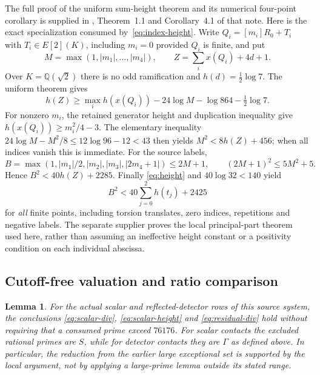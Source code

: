 \documentclass[11pt,a4paper]{article}
\newtheorem{lemma}[theorem]{Lemma}
\newcommand{\Q}{\mathbb Q}\newcommand{\Z}{\mathbb Z}
\begin{document}
The full proof of the uniform sum-height theorem and its numerical
four-point corollary is supplied in
,
Theorem~1.1 and Corollary~4.1 of that note. Here is the exact
specialization consumed by~\eqref{eq:index-height}.
Write $Q_i=[m_i]R_0+T_i$ with $T_i\in E[2](K)$,
including $m_i=0$ provided $Q_i$ is finite, and put
\[
 M=\max(1,|m_1|,\ldots,|m_4|),\qquad
 Z=\sum_i x(Q_i)+4d+1 .
\]
Over $K=\Q(\sqrt2)$ there is no odd ramification and
$h(d)=\tfrac12\log7$. The uniform theorem gives
\[
 h(Z)\ge\max_i h(x(Q_i))
              -24\log M-\log864-\tfrac12\log7 .
\]
For nonzero $m_i$, the retained generator height and duplication
inequality give $h(x(Q_i))\ge m_i^2/4-3$.
The elementary inequality
$24\log M-M^2/8\le12\log96-12<43$ then yields
$M^2<8h(Z)+456$; when all indices vanish this is immediate.
For the source labels,
\[
 B=\max(1,|m_1|/2,|m_2|,|m_3|,|2m_4+1|)
 \le2M+1,\qquad (2M+1)^2\le5M^2+5 .
\]
Hence $B^2<40h(Z)+2285$. Finally \eqref{eq:height} and
$40\log32<140$ yield
\[
                 B^2<40\sum_{j=0}^2h(t_j)+2425
\]
for \emph{all} finite points, including torsion translates,
zero indices, repetitions and negative labels.
The separate supplier proves the local principal-part theorem used
here, rather than assuming an ineffective height constant or a
positivity condition on each individual abscissa.

\subsection{Cutoff-free valuation and ratio comparison}
\label{sec:small-prime-audit}

\begin{lemma}\label{lem:cutoff-free}
For the actual scalar and reflected-detector rows of this source
system, the conclusions \eqref{eq:scalar-div},
\eqref{eq:scalar-height} and \eqref{eq:residual-div}
hold without requiring that a consumed prime exceed $76176$.
For scalar contacts the excluded rational primes are $S$, while
for detector contacts they are $\Gamma$ as defined above.
In particular, the reduction from the earlier large exceptional
set is supported by the \emph{local argument}, not by applying a
large-prime lemma outside its stated range.
\end{lemma}
\end{document}
